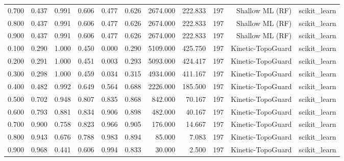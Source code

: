 \begin{tabular}{lrrrrrrrrrr}
0.700 & 0.437 & 0.991 & 0.606 & 0.477 & 0.626 & 2674.000 & 222.833 & 197 & Shallow ML (RF) & scikit\_learn \\
0.800 & 0.437 & 0.991 & 0.606 & 0.477 & 0.626 & 2674.000 & 222.833 & 197 & Shallow ML (RF) & scikit\_learn \\
0.900 & 0.437 & 0.991 & 0.606 & 0.477 & 0.626 & 2674.000 & 222.833 & 197 & Shallow ML (RF) & scikit\_learn \\
0.100 & 0.290 & 1.000 & 0.450 & 0.000 & 0.290 & 5109.000 & 425.750 & 197 & Kinetic-TopoGuard & scikit\_learn \\
0.200 & 0.291 & 1.000 & 0.451 & 0.003 & 0.293 & 5093.000 & 424.417 & 197 & Kinetic-TopoGuard & scikit\_learn \\
0.300 & 0.298 & 1.000 & 0.459 & 0.034 & 0.315 & 4934.000 & 411.167 & 197 & Kinetic-TopoGuard & scikit\_learn \\
0.400 & 0.482 & 0.992 & 0.649 & 0.564 & 0.688 & 2226.000 & 185.500 & 197 & Kinetic-TopoGuard & scikit\_learn \\
0.500 & 0.702 & 0.948 & 0.807 & 0.835 & 0.868 & 842.000 & 70.167 & 197 & Kinetic-TopoGuard & scikit\_learn \\
0.600 & 0.793 & 0.881 & 0.834 & 0.906 & 0.898 & 482.000 & 40.167 & 197 & Kinetic-TopoGuard & scikit\_learn \\
0.700 & 0.900 & 0.758 & 0.823 & 0.966 & 0.905 & 176.000 & 14.667 & 197 & Kinetic-TopoGuard & scikit\_learn \\
0.800 & 0.943 & 0.676 & 0.788 & 0.983 & 0.894 & 85.000 & 7.083 & 197 & Kinetic-TopoGuard & scikit\_learn \\
0.900 & 0.968 & 0.441 & 0.606 & 0.994 & 0.833 & 30.000 & 2.500 & 197 & Kinetic-TopoGuard & scikit\_learn \\
\bottomrule
\end{tabular}